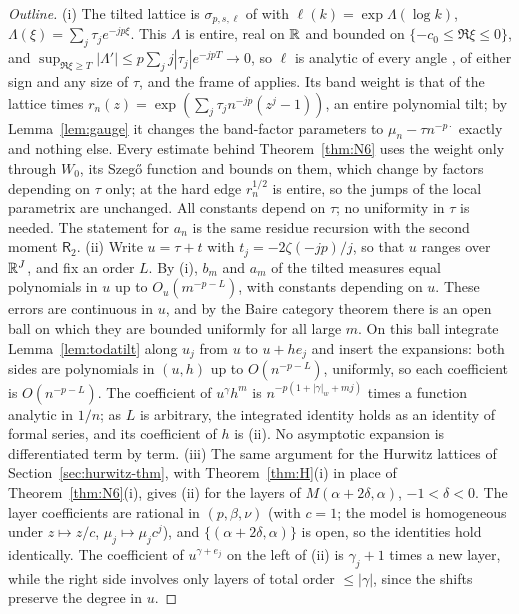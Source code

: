 \begin{proof}[Outline]
(i) The tilted lattice is $\sigma_{p,s,\ell}$ of \cite{PaperII} with $\ell(k)=\exp\Lambda(\log k)$, $\Lambda(\xi)=\sum_j\tau_je^{-jp\xi}$. This
$\Lambda$ is entire, real on $\mathbb{R}$ and bounded on $\{-c_0\le\Re\xi\le0\}$, and $\sup_{\Re\xi\ge T}|\Lambda'|\le p\sum_jj|\tau_j|e^{-jpT}\to0$, so $\ell$
is analytic of every angle \cite[Definition~1.1]{PaperII}, of either sign and any size of $\tau$, and the frame of \cite{PaperII} applies. Its
band weight is that of the lattice times $r_n(z)=\exp(\sum_j\tau_jn^{-jp}(z^j-1))$, an entire polynomial tilt; by Lemma~\ref{lem:gauge}
it changes the band-factor parameters to $\mu_n-\tau n^{-p\cdot}$ exactly and nothing else. Every estimate behind Theorem~\ref{thm:N6}
uses the weight only through $W_0$, its Szeg\H{o} function and bounds on them, which change by factors depending on $\tau$ only; at
the hard edge $r_n^{1/2}$ is entire, so the jumps of the local parametrix are unchanged. All constants depend on $\tau$; no uniformity in
$\tau$ is needed. The statement for $a_n$ is the same residue recursion with the second moment $\mathsf R_2$.
(ii) Write $u=\tau+t$ with $t_j=-2\zeta(-jp)/j$, so that $u$ ranges over $\mathbb{R}^J$, and fix an order $L$. By (i), $b_m$ and $a_m$ of the tilted
measures equal polynomials in $u$ up to $O_u(m^{-p-L})$, with constants depending on $u$. These errors are continuous in $u$, and by the
Baire category theorem there is an open ball on which they are bounded uniformly for all large $m$. On this ball integrate
Lemma~\ref{lem:todatilt} along $u_j$ from $u$ to $u+he_j$ and insert the expansions: both sides are polynomials in $(u,h)$ up to
$O(n^{-p-L})$, uniformly, so each coefficient is $O(n^{-p-L})$. The coefficient of $u^\gamma h^m$ is $n^{-p(1+|\gamma|_w+mj)}$ times a
function analytic in $1/n$; as $L$ is arbitrary, the integrated identity holds as an identity of formal series, and its coefficient of $h$ is
(ii). No asymptotic expansion is differentiated term by term.
(iii) The same argument for the Hurwitz lattices of Section~\ref{sec:hurwitz-thm}, with Theorem~\ref{thm:H}(i) in place of
Theorem~\ref{thm:N6}(i), gives (ii) for the layers of $M(\alpha+2\delta,\alpha)$, $-1<\delta<0$. The layer coefficients are rational in
$(p,\beta,\nu)$ (with $c=1$; the model is homogeneous under $z\mapsto z/c$, $\mu_j\mapsto\mu_jc^j$), and $\{(\alpha+2\delta,\alpha)\}$ is open,
so the identities hold identically. The coefficient of $u^{\gamma+e_j}$ on the left of (ii) is $\gamma_j+1$ times a new layer, while the
right side involves only layers of total order $\le|\gamma|$, since the shifts preserve the degree in $u$.
\end{proof}

